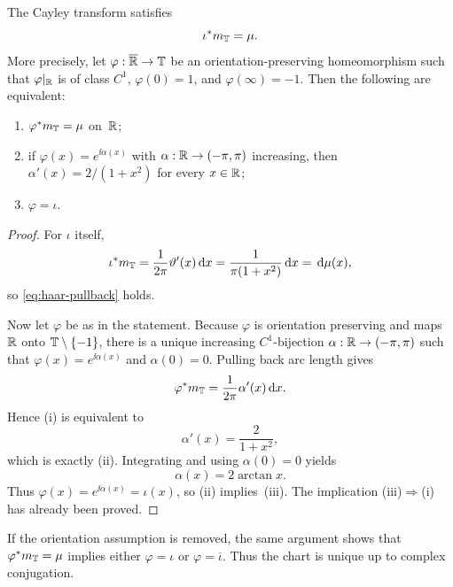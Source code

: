 \begin{proposition}%
\label{thm:haar-pullback-uniqueness}
The Cayley transform satisfies
\begin{equation}\label{eq:haar-pullback}
\iota^{*}m_{\mathbb{T}}=\mu.
\end{equation}
More precisely, let
$\varphi:\overline{\mathbb{R}}\to\mathbb{T}$ be an orientation-preserving homeomorphism
such that $\varphi|_{\mathbb{R}}$ is of class $C^{1}$,
$\varphi(0)=1$, and $\varphi(\infty)=-1$.  Then the following are
equivalent:
\begin{enumerate}[label=(\roman*)]
\item $\varphi^{*}m_{\mathbb{T}}=\mu$ on~$\mathbb{R}$;
\item if $\varphi(x)=e^{\ii\alpha(x)}$ with
      $\alpha:\mathbb{R}\to(-\pi,\pi)$ increasing, then
      $\alpha'(x)=2/(1+x^{2})$ for every $x\in\mathbb{R}$;
\item $\varphi=\iota$.
\end{enumerate}
\end{proposition}

\begin{proof}
For $\iota$ itself,
\[
\iota^{*}m_{\mathbb{T}}
=\frac{1}{2\pi}\vartheta'(x)\,\mathrm{d} x
=\frac{1}{\pi(1+x^{2})}\,\mathrm{d} x
=\,\mathrm{d}\mu(x),
\]
so \eqref{eq:haar-pullback} holds.

Now let $\varphi$ be as in the statement.  Because $\varphi$ is
orientation preserving and maps $\mathbb{R}$ onto $\mathbb{T}\setminus\{-1\}$, there
is a unique increasing $C^{1}$-bijection
$\alpha:\mathbb{R}\to(-\pi,\pi)$ such that $\varphi(x)=e^{\ii\alpha(x)}$ and
$\alpha(0)=0$.  Pulling back arc length gives
\[
\varphi^{*}m_{\mathbb{T}}=\frac{1}{2\pi}\alpha'(x)\,\mathrm{d} x.
\]
Hence (i) is equivalent to
\[
\alpha'(x)=\frac{2}{1+x^{2}},
\]
which is exactly (ii).  Integrating and using $\alpha(0)=0$ yields
\[
\alpha(x)=2\arctan x.
\]
Thus $\varphi(x)=e^{\ii\alpha(x)}=\iota(x)$, so (ii) implies~(iii).  The
implication (iii)$\Rightarrow$(i) has already been proved.
\end{proof}

\begin{remark}\label{rem:orientation-reversal}
If the orientation assumption is removed, the same argument shows that
$\varphi^{*}m_{\mathbb{T}}=\mu$ implies either $\varphi=\iota$ or
$\varphi=\overline{\iota}$.  Thus the chart is unique up to complex
conjugation.
\end{remark}
